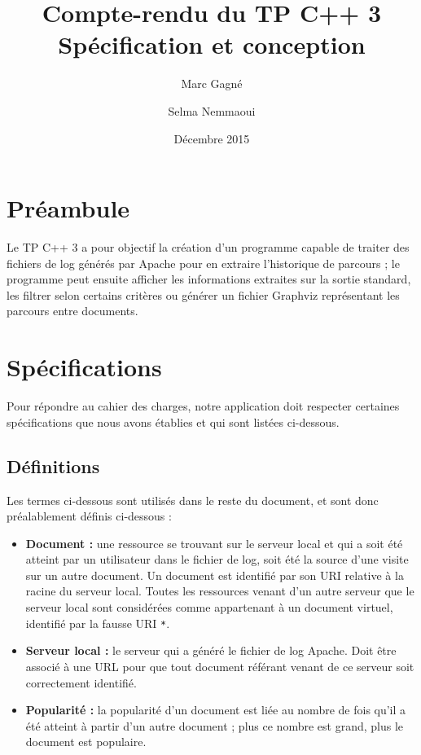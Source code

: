 \documentclass[11pt,a4paper]{article}
\begin{document}
	
	\title{
		Compte-rendu du TP C++ 3\\
		Spécification et conception
	}
	\author{
		Marc Gagné\\
		\and
		Selma Nemmaoui
	}
	\date{Décembre 2015}
	\maketitle
	
	\section*{Préambule}
	Le TP C++ 3 a pour objectif la création d'un programme capable de traiter des fichiers de log générés par Apache pour en extraire l'historique de parcours ; le programme peut ensuite afficher les informations extraites sur la sortie standard, les filtrer selon certains critères ou générer un fichier Graphviz représentant les parcours entre documents.
	
	\section{Spécifications}
	
	Pour répondre au cahier des charges, notre application doit respecter certaines spécifications que nous avons établies et qui sont listées ci-dessous.
	
	\subsection{Définitions}
	Les termes ci-dessous sont utilisés dans le reste du document, et sont donc préalablement définis ci-dessous :
	\begin{itemize}
		\item \textbf{Document :} une ressource se trouvant sur le serveur local et qui a soit été atteint par un utilisateur dans le fichier de log, soit été la source d'une visite sur un autre document. Un document est identifié par son URI relative à la racine du serveur local. Toutes les ressources venant d'un autre serveur que le serveur local sont considérées comme appartenant à un document virtuel, identifié par la fausse URI \texttt{*}.
		\item \textbf{Serveur local :} le serveur qui a généré le fichier de log Apache. Doit être associé à une URL pour que tout document référant venant de ce serveur soit correctement identifié.
		\item \textbf{Popularité :} la popularité d'un document est liée au nombre de fois qu'il a été atteint à partir d'un autre document ; plus ce nombre est grand, plus le document est populaire.
	\end{itemize}
	
\end{document}
